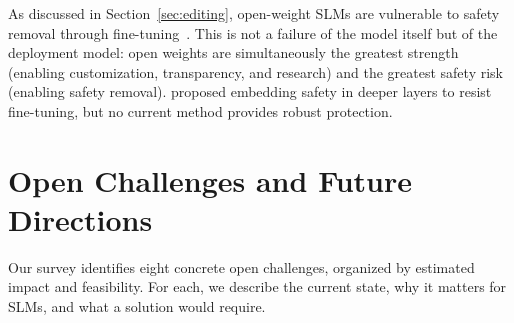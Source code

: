 \documentclass[12pt,a4paper]{article}
\begin{document}
As discussed in Section~\ref{sec:editing}, open-weight SLMs are vulnerable to safety removal through fine-tuning~\citep{qi2024finetuning}. This is not a failure of the model itself but of the deployment model: open weights are simultaneously the greatest strength (enabling customization, transparency, and research) and the greatest safety risk (enabling safety removal). \citet{huang2024lazy} proposed embedding safety in deeper layers to resist fine-tuning, but no current method provides robust protection.


\section{Open Challenges and Future Directions}\label{sec:challenges}

Our survey identifies eight concrete open challenges, organized by estimated impact and feasibility. For each, we describe the current state, why it matters for SLMs, and what a solution would require.
\end{document}
